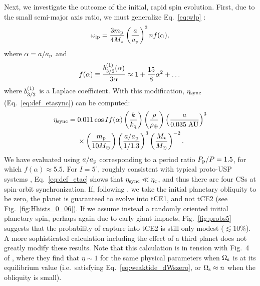 \documentclass[
        fleqn,
        usenatbib,
    ]{mnras}
\newcommand*{\p}[1]{\left(#1\right)}
\begin{document}
Next, we investigate the outcome of the initial, rapid spin evolution. First,
due to the small semi-major axis ratio, we must generalize Eq.~\eqref{eq:wlp}
\citep[see e.g.][]{lai_2017}:
\begin{equation}
    \omega_{\rm lp} = \frac{3m_{\rm p}}{4M_{\star}}
        \p{\frac{a}{a_{\rm p}}}^3 n f(\alpha),
        \label{eq:def_g_usp}
\end{equation}
where $\alpha = a / a_{\rm p}$ and
\begin{equation}
    f(\alpha) \equiv \frac{b_{\rm 3/2}^{(1)}(\alpha)}{3\alpha}
        \approx 1 + \frac{15}{8}\alpha^2 + \dots
\end{equation}
where $b_{\rm 3/2}^{(1)}$ is a Laplace coefficient. With this modification,
$\eta_{\rm sync}$ (Eq.~\ref{eq:def_etasync}) can be computed:
\begin{align}
    \eta_{\rm sync} ={}& 0.011 \cos I f(\alpha)
            \p{\frac{k}{k_{\rm q}}}
            \p{\frac{\rho}{\rho_{\oplus}}}
            \p{\frac{a}{0.035 \;\mathrm{AU}}}^{3}\nonumber\\
        &\times
            \p{\frac{m_{\rm p}}{10 M_{\oplus}}}
            \p{\frac{a / a_{\rm p}}{1/1.3}}^{3}
            \p{\frac{M_\star}{M_{\odot}}}^{-2}
            .\label{eq:etasync_usp}
\end{align}
We have evaluated using $a / a_{\rm p}$ corresponding to a period ratio $P_{\rm
p} / P = 1.5$, for which $f(\alpha) \approx 5.5$. For $I = 5^\circ$, roughly
consistent with typical proto-USP systems \citep{dai2018larger},
Eq.~\eqref{eq:def_etac} shows that $\eta_{\rm sync} \ll \eta_{\rm c}$, and thus
there are four CSs at spin-orbit synchronization. If, following
\citet{millholland2020formation}, we take the initial planetary obliquity to be
zero, the planet is guaranteed to evolve into tCE1, and not tCE2 (see
Fig.~\ref{fig:Hhists_0_06}). If we assume instead a randomly oriented initial
planetary spin, perhaps again due to early giant impacts, Fig.~\ref{fig:probs5}
suggests that the probability of capture into tCE2 is still only modest
($\lesssim 10\%$). A more sophisticated calculation including the effect of a
third planet does not greatly modify these results. Note that this calculation
is in tension with Fig.~4 of \citet{millholland2020formation}, where they find
that $\eta \sim 1$ for the same physical parameters when $\Omega_{\rm s}$ is at
its equilibrium value (i.e.\ satisfying Eq.~\ref{eq:weaktide_dWszero}, or
$\Omega_{\rm s} \approx n$ when the obliquity is small).
\end{document}
